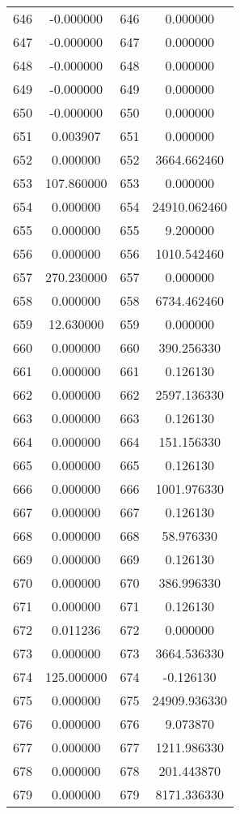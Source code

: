 \documentclass[12pt]{article}
\begin{document}
\begin{longtable}{@{}cccc@{}}
646 & -0.000000 & 646 & 0.000000 \\
647 & -0.000000 & 647 & 0.000000 \\
648 & -0.000000 & 648 & 0.000000 \\
649 & -0.000000 & 649 & 0.000000 \\
650 & -0.000000 & 650 & 0.000000 \\
651 & 0.003907 & 651 & 0.000000 \\
652 & 0.000000 & 652 & 3664.662460 \\
653 & 107.860000 & 653 & 0.000000 \\
654 & 0.000000 & 654 & 24910.062460 \\
655 & 0.000000 & 655 & 9.200000 \\
656 & 0.000000 & 656 & 1010.542460 \\
657 & 270.230000 & 657 & 0.000000 \\
658 & 0.000000 & 658 & 6734.462460 \\
659 & 12.630000 & 659 & 0.000000 \\
660 & 0.000000 & 660 & 390.256330 \\
661 & 0.000000 & 661 & 0.126130 \\
662 & 0.000000 & 662 & 2597.136330 \\
663 & 0.000000 & 663 & 0.126130 \\
664 & 0.000000 & 664 & 151.156330 \\
665 & 0.000000 & 665 & 0.126130 \\
666 & 0.000000 & 666 & 1001.976330 \\
667 & 0.000000 & 667 & 0.126130 \\
668 & 0.000000 & 668 & 58.976330 \\
669 & 0.000000 & 669 & 0.126130 \\
670 & 0.000000 & 670 & 386.996330 \\
671 & 0.000000 & 671 & 0.126130 \\
672 & 0.011236 & 672 & 0.000000 \\
673 & 0.000000 & 673 & 3664.536330 \\
674 & 125.000000 & 674 & -0.126130 \\
675 & 0.000000 & 675 & 24909.936330 \\
676 & 0.000000 & 676 & 9.073870 \\
677 & 0.000000 & 677 & 1211.986330 \\
678 & 0.000000 & 678 & 201.443870 \\
679 & 0.000000 & 679 & 8171.336330 \\

\end{longtable}
\end{document}
